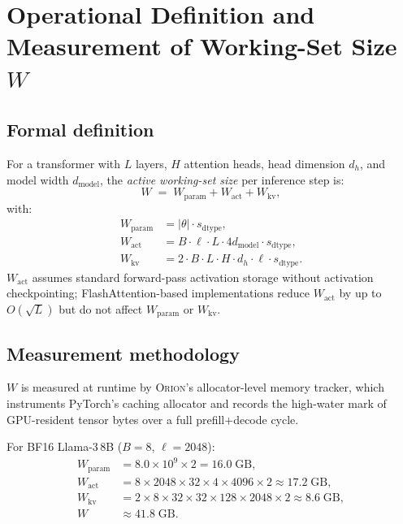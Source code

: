 
\section{Operational Definition and Measurement of Working-Set Size $W$}
\label{app:working_set}

\subsection{Formal definition}

For a transformer with $L$ layers, $H$ attention heads, head dimension $d_h$,
and model width $d_{\mathrm{model}}$, the \emph{active working-set size}
per inference step is:
\begin{equation}
W \;=\; W_{\mathrm{param}} + W_{\mathrm{act}} + W_{\mathrm{kv}},
\label{eq:W_def}
\end{equation}
with:
\begin{align}
W_{\mathrm{param}} &= |\theta| \cdot s_{\mathrm{dtype}}, \label{eq:Wparam}\\
W_{\mathrm{act}}   &= B \cdot \ell \cdot L \cdot 4 d_{\mathrm{model}}
                    \cdot s_{\mathrm{dtype}}, \label{eq:Wact}\\
W_{\mathrm{kv}}    &= 2 \cdot B \cdot L \cdot H \cdot d_h \cdot \ell
                    \cdot s_{\mathrm{dtype}}. \label{eq:Wkv}
\end{align}
$W_{\mathrm{act}}$ assumes standard forward-pass activation storage without
activation checkpointing; FlashAttention-based implementations reduce
$W_{\mathrm{act}}$ by up to $O(\sqrt{L})$ but do not affect $W_{\mathrm{param}}$
or $W_{\mathrm{kv}}$.

\subsection{Measurement methodology}

$W$ is measured at runtime by \textsc{Orion}'s allocator-level memory tracker,
which instruments PyTorch's caching allocator and records the high-water mark
of GPU-resident tensor bytes over a full prefill+decode cycle.

For BF16 Llama-3\,8B ($B{=}8$, $\ell{=}2048$):
\begin{align*}
W_{\mathrm{param}} &= 8.0 \times 10^9 \times 2 = 16.0\;\text{GB}, \\
W_{\mathrm{act}}   &= 8 \times 2048 \times 32 \times 4 \times 4096 \times 2
                    \approx 17.2\;\text{GB}, \\
W_{\mathrm{kv}}    &= 2 \times 8 \times 32 \times 32 \times 128 \times 2048
                    \times 2 \approx 8.6\;\text{GB}, \\
W               &\approx 41.8\;\text{GB}.
\end{align*}

